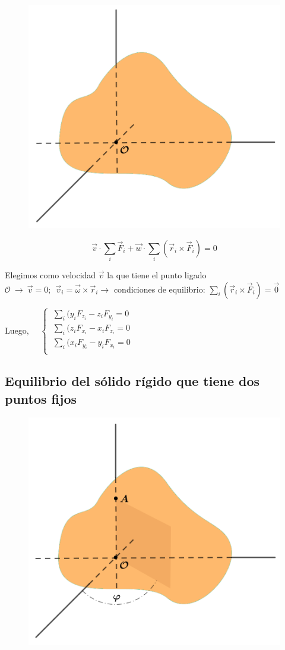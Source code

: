 \vspace{-5mm} %
  \begin{figure}[H]
	\centering
	\includegraphics[width=.6\textwidth]{imagenes/imagenes06/T06IM06.png}
\end{figure}
 
 $$\vec v \cdot \displaystyle \sum_i \vec F_i + \vec w\cdot \sum_i(\vec r_i \times \vec F_i)=0$$
 
 Elegimos como velocidad $\vec v$ la que tiene el punto ligado $\mathcal O \ \to \ \vec v=0;\ \ \vec v_i=\vec \omega \times \vec r_i \to $ condiciones de equilibrio: $\displaystyle \sum_i (\vec r_i \times \vec F_i)=\vec 0$
 
 Luego, $\quad \begin{cases} 
 \ \displaystyle \sum_i (y_iF_{z_i}-z_iF_{y_i}=0\\
  \ \displaystyle \sum_i (z_iF_{x_i}-x_iF_{z_i}=0\\
   \ \displaystyle \sum_i (x_iF_{y_i}-y_iF_{x_i}=0\\	
 \end{cases}$


  \subsection{Equilibrio del sólido rígido que tiene dos puntos fijos}
 
\vspace{-5mm} %
   \begin{figure}[H]
	\centering
	\includegraphics[width=.6\textwidth]{imagenes/imagenes06/T06IM07.png}
\end{figure}

